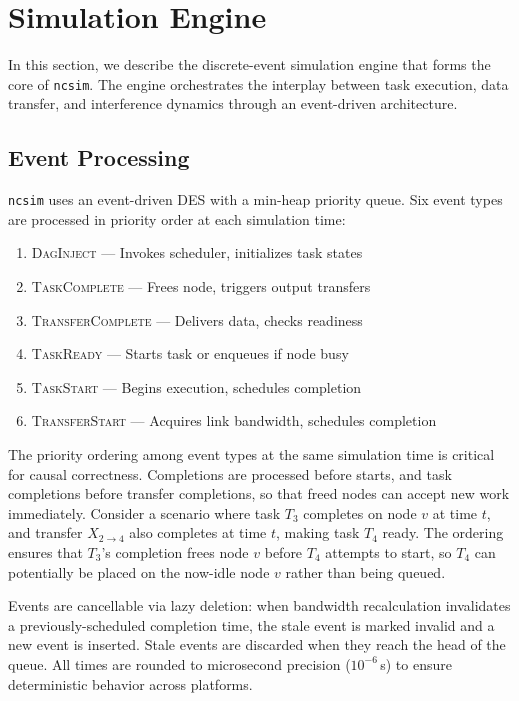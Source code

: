 \documentclass[conference]{IEEEtran}
\newcommand{\ncsim}{\texttt{ncsim}}
\begin{document}
\section{Simulation Engine}
\label{sec:engine}

In this section, we describe the discrete-event simulation engine that
forms the core of \ncsim{}.  The engine orchestrates the interplay between
task execution, data transfer, and interference dynamics through an
event-driven architecture.

\subsection{Event Processing}

\ncsim{} uses an event-driven DES with a min-heap priority queue.  Six event
types are processed in priority order at each simulation time:

\begin{enumerate}[itemsep=1pt,leftmargin=*]
\item \textsc{DagInject} --- Invokes scheduler, initializes task states
\item \textsc{TaskComplete} --- Frees node, triggers output transfers
\item \textsc{TransferComplete} --- Delivers data, checks readiness
\item \textsc{TaskReady} --- Starts task or enqueues if node busy
\item \textsc{TaskStart} --- Begins execution, schedules completion
\item \textsc{TransferStart} --- Acquires link bandwidth, schedules completion
\end{enumerate}

The priority ordering among event types at the same simulation time is
critical for causal correctness.  Completions are processed before starts,
and task completions before transfer completions, so that freed nodes can
accept new work immediately.  Consider a scenario where task $T_3$ completes
on node $v$ at time $t$, and transfer $X_{2 \to 4}$ also completes at time
$t$, making task $T_4$ ready.  The ordering ensures that $T_3$'s completion
frees node $v$ before $T_4$ attempts to start, so $T_4$ can potentially be
placed on the now-idle node $v$ rather than being queued.

Events are cancellable via lazy deletion: when bandwidth recalculation
invalidates a previously-scheduled completion time, the stale event is
marked invalid and a new event is inserted.  Stale events are discarded
when they reach the head of the queue.  All times are rounded to
microsecond precision ($10^{-6}$\,s) to ensure deterministic behavior
across platforms.
\end{document}
